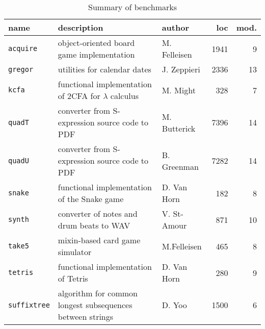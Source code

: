 
\begin{table} \footnotesize
  \caption{Summary of benchmarks}
\begin{tabular}{p{1.5cm} | p{6.9cm} | p{1.9cm} | r | r}
             {\bf  name} & {\bf description} & {\bf author} & {\bf loc} & {\bf mod.} \\ \hline

\texttt{acquire} & object-oriented board game implementation      & M. Felleisen & 1941 & 9 \\ \hline

\texttt{gregor}  & utilities for calendar dates                   & J. Zeppieri  & 2336 & 13\\ \hline

\texttt{kcfa}    & functional implementation of 2CFA for \(\lambda\) calculus       & M. Might & 328 & 7\\ \hline

\texttt{quadT}   & converter from S-expression source code to PDF & M. Butterick & 7396 & 14\\ \hline

\texttt{quadU}   & converter from S-expression source code to PDF & B. Greenman  & 7282 & 14 \\ \hline

\texttt{snake}   & functional implementation of the Snake game    & D. Van Horn & 182 & 8 \\ \hline

\texttt{synth}  & converter of notes and drum beats to WAV & V. St-Amour & 871 & 10 \\ \hline

\texttt{take5} & mixin-based card game simulator & M.Felleisen & 465 & 8\\ \hline

\texttt{tetris} & functional implementation of Tetris & D. Van Horn &   280 & 9 \\ \hline

\texttt{suffix\-tree} & algorithm for common longest subsequences between strings & D. Yoo & 1500 & 6 \\

\end{tabular}

\label{table:benchmark-descriptions}

\end{table}

